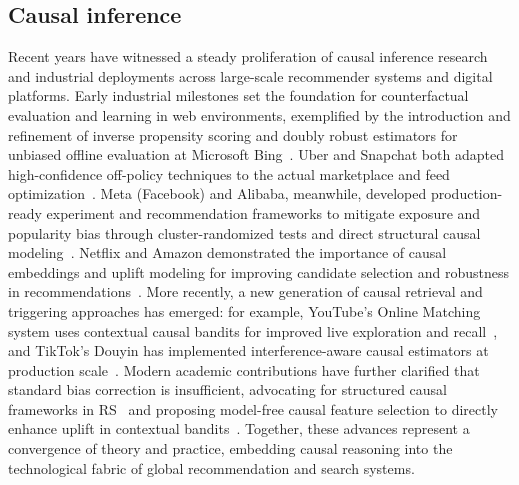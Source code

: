 \documentclass[sigconf, authorversion]{acmart}
\begin{document}
\subsection{Causal inference}
Recent years have witnessed a steady proliferation of causal inference research and industrial deployments across large-scale recommender systems and digital platforms. Early industrial milestones set the foundation for counterfactual evaluation and learning in web environments, exemplified by the introduction and refinement of inverse propensity scoring and doubly robust estimators for unbiased offline evaluation at Microsoft Bing~\cite{graepel2010counterfactual, bottou2013counterfactual, li2015doubly}. Uber and Snapchat both adapted high-confidence off-policy techniques to the actual marketplace and feed optimization~\cite{grbovic2019high, kim2021improving}. Meta (Facebook) and Alibaba, meanwhile, developed production-ready experiment and recommendation frameworks to mitigate exposure and popularity bias through cluster-randomized tests and direct structural causal modeling~\cite{somani2020ab, liu2021eliminating}. Netflix and Amazon demonstrated the importance of causal embeddings and uplift modeling for improving candidate selection and robustness in recommendations~\cite{zhou2021causal, amazon2021causal}. More recently, a new generation of causal retrieval and triggering approaches has emerged: for example, YouTube’s Online Matching system uses contextual causal bandits for improved live exploration and recall~\cite{yi2023online}, and TikTok’s Douyin has implemented interference-aware causal estimators at production scale~\cite{farias2023correcting}. Modern academic contributions have further clarified that standard bias correction is insufficient, advocating for structured causal frameworks in RS~\cite{cavenaghi2023towards} and proposing model-free causal feature selection to directly enhance uplift in contextual bandits~\cite{zhao2024causal}. Together, these advances represent a convergence of theory and practice, embedding causal reasoning into the technological fabric of global recommendation and search systems.
\end{document}
